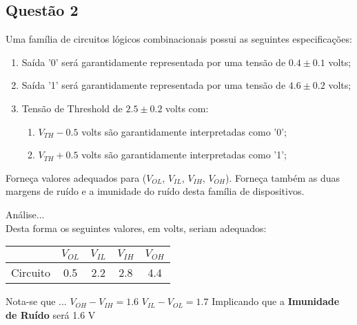 \documentclass{article}
\begin{document}
\newpage
        \subsection{Questão 2}
            \begin{exercise}
                Uma família de circuitos lógicos combinacionais possui as seguintes especificações:
                    \begin{enumerate}
                        \item Saída '0' será garantidamente representada por uma tensão de $0.4 \pm 0.1$ volts;
                        \item Saída '1' será garantidamente representada por uma tensão de $4.6 \pm 0.2$ volts;
                        \item Tensão de Threshold de $2.5 \pm 0.2$ volts com:
                            \begin{enumerate}[noitemsep]
                                \item $V_{TH}-0.5$ volts são garantidamente interpretadas como '0';
                                \item $V_{TH}+0.5$ volts são garantidamente interpretadas como '1';
                            \end{enumerate}
                    \end{enumerate}
                Forneça valores adequados para ($V_{OL}$, $V_{IL}$, $V_{IH}$, $V_{OH}$). Forneça também as duas margens de ruído e a imunidade do ruído desta família de dispositivos.
            \end{exercise}
            \begin{resolution}
                Análise...\\
                Desta forma os seguintes valores, em volts, seriam adequados:
                    \begin{table}[H]
                        \centering  
                        \begin{tabular}[]{l|cccc}\hline
                                     & $V_{OL}$ & $V_{IL}$ & $V_{IH}$ & $V_{OH}$\\\hline
                            Circuito & 0.5      & 2.2      & 2.8      & 4.4\\\hline
                        \end{tabular}
                    \end{table}
                Nota-se que ...
                    $V_{OH} - V_{IH} = 1.6$
                    $V_{IL} - V_{OL} = 1.7$
                Implicando que a \textbf{Imunidade de Ruído} será 1.6 V
            \end{resolution}
\end{document}
